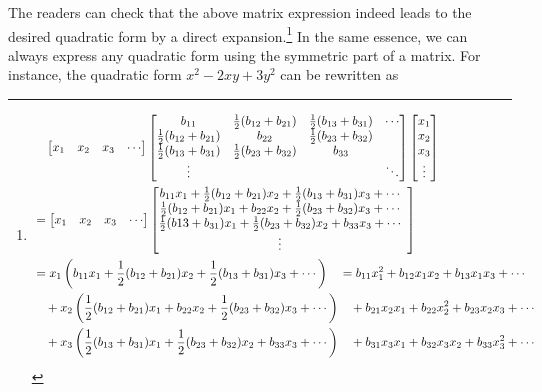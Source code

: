 The readers can check that the above matrix expression indeed leads to the desired quadratic form by a direct expansion.\footnote{\scriptsize\begin{align*}
&\quad \begin{bmatrix}
x_1 & x_2 & x_3 & \cdots
\end{bmatrix}
\left[\begin{array}{@{}cccc@{}}
b_{11} & \frac{1}{2}(b_{12} + b_{21}) & \frac{1}{2}(b_{13} + b_{31}) & \cdots \\
\frac{1}{2}(b_{12} + b_{21}) & b_{22} & \frac{1}{2}(b_{23} + b_{32}) &  \\
\frac{1}{2}(b_{13} + b_{31}) & \frac{1}{2}(b_{23} + b_{32}) & b_{33} &  \\
\vdots & & & \ddots
\end{array}\right]
\begin{bmatrix}
x_1 \\
x_2 \\
x_3 \\
\vdots
\end{bmatrix} \\
&=
\begin{bmatrix}
x_1 & x_2 & x_3 & \cdots
\end{bmatrix}
\left[\begin{array}{@{}cccc@{}}
b_{11}x_1 + \frac{1}{2}(b_{12} + b_{21})x_2 + \frac{1}{2}(b_{13} + b_{31})x_3 + \cdots \\
\frac{1}{2}(b_{12} + b_{21})x_1 + b_{22}x_2 + \frac{1}{2}(b_{23} + b_{32})x_3 + \cdots \\
\frac{1}{2}(b{13} + b_{31})x_1 + \frac{1}{2}(b_{23} + b_{32})x_2 + b_{33}x_3 + \cdots \\
\vdots 
\end{array}\right] \\
&= x_1\left(b_{11}x_1 + \frac{1}{2}(b_{12} + b_{21})x_2 + \frac{1}{2}(b_{13} + b_{31})x_3 + \cdots\right) \quad = b_{11}x_1^2 + b_{12}x_1x_2 + b_{13}x_1x_3 + \cdots \\
&\quad + x_2\left(\frac{1}{2}(b_{12} + b_{21})x_1 + b_{22}x_2 + \frac{1}{2}(b_{23} + b_{32})x_3 + \cdots\right) \quad + b_{21}x_2x_1 + b_{22}x_2^2 + b_{23}x_2x_3 + \cdots \\
&\quad + x_3\left(\frac{1}{2}(b_{13} + b_{31})x_1 + \frac{1}{2}(b_{23} + b_{32})x_2 + b_{33}x_3 + \cdots\right) \quad + b_{31}x_3x_1 + b_{32}x_3x_2 + b_{33}x_3^2 + \cdots
\end{align*}} In the same essence, we can always express any quadratic form using the symmetric part of a matrix. For instance, the quadratic form $x^2 - 2xy + 3y^2$ can be rewritten as
